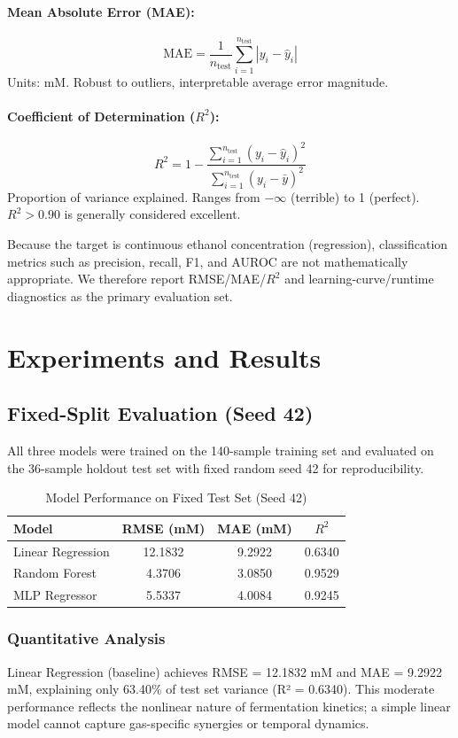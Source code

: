 \documentclass[conference]{IEEEtran}
\begin{document}
\paragraph{Mean Absolute Error (MAE):}
\[
\text{MAE} = \frac{1}{n_{\text{test}}}\sum_{i=1}^{n_{\text{test}}}|y_i - \hat{y}_i|
\]
Units: mM. Robust to outliers, interpretable average error magnitude.

\paragraph{Coefficient of Determination ($R^2$):}
\[
R^2 = 1 - \frac{\sum_{i=1}^{n_{\text{test}}}(y_i - \hat{y}_i)^2}{\sum_{i=1}^{n_{\text{test}}}(y_i - \bar{y})^2}
\]
Proportion of variance explained. Ranges from $-\infty$ (terrible) to 1 (perfect). $R^2 > 0.90$ is generally considered excellent.

Because the target is continuous ethanol concentration (regression), classification metrics such as precision, recall, F1, and AUROC are not mathematically appropriate. We therefore report RMSE/MAE/$R^2$ and learning-curve/runtime diagnostics as the primary evaluation set.

\section{Experiments and Results}

\subsection{Fixed-Split Evaluation (Seed 42)}

All three models were trained on the 140-sample training set and evaluated on the 36-sample holdout test set with fixed random seed 42 for reproducibility.

\begin{table}[htbp]
\caption{Model Performance on Fixed Test Set (Seed 42)}
\centering
\begin{tabular}{lccc}
\toprule
Model & RMSE (mM) & MAE (mM) & $R^2$ \\
\midrule
Linear Regression & 12.1832 & 9.2922 & 0.6340 \\
Random Forest & 4.3706 & 3.0850 & 0.9529 \\
MLP Regressor & 5.5337 & 4.0084 & 0.9245 \\
\bottomrule
\end{tabular}
\end{table}

\subsubsection{Quantitative Analysis}
Linear Regression (baseline) achieves RMSE = 12.1832 mM and MAE = 9.2922 mM, explaining only 63.40\% of test set variance (R² = 0.6340). This moderate performance reflects the nonlinear nature of fermentation kinetics; a simple linear model cannot capture gas-specific synergies or temporal dynamics.
\end{document}
